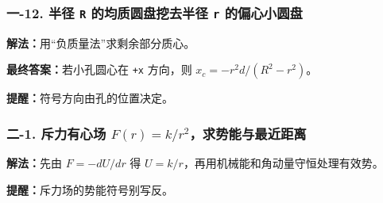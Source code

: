 \documentclass[12pt,a4paper]{ctexart}
\begin{document}
\subsubsection*{一-12. 半径 \texttt{R} 的均质圆盘挖去半径 \texttt{r} 的偏心小圆盘}
\begin{tcolorbox}[colback=gray!2!white,colframe=black!60,title={题目}]

\end{tcolorbox}
\begin{tcolorbox}[colback=blue!2!white,colframe=blue!55!black,title={完整答案}]
\textbf{解法：}用“负质量法”求剩余部分质心。\par
\textbf{最终答案：}若小孔圆心在 \texttt{+x} 方向，则 \(x_c=-r^2d/(R^2-r^2)\)。\par

\end{tcolorbox}
\begin{tcolorbox}[colback=red!2!white,colframe=red!55!black,title={易错点}]
\textbf{提醒：}符号方向由孔的位置决定。\par
\end{tcolorbox}

\subsubsection*{二-1. 斥力有心场 \(F(r)=k/r^2\)，求势能与最近距离}
\begin{tcolorbox}[colback=gray!2!white,colframe=black!60,title={题目}]

\end{tcolorbox}
\begin{tcolorbox}[colback=blue!2!white,colframe=blue!55!black,title={完整答案}]
\textbf{解法：}先由 \(F=-dU/dr\) 得 \(U=k/r\)，再用机械能和角动量守恒处理有效势。\par


\end{tcolorbox}
\begin{tcolorbox}[colback=red!2!white,colframe=red!55!black,title={易错点}]
\textbf{提醒：}斥力场的势能符号别写反。\par
\end{tcolorbox}
\end{document}
